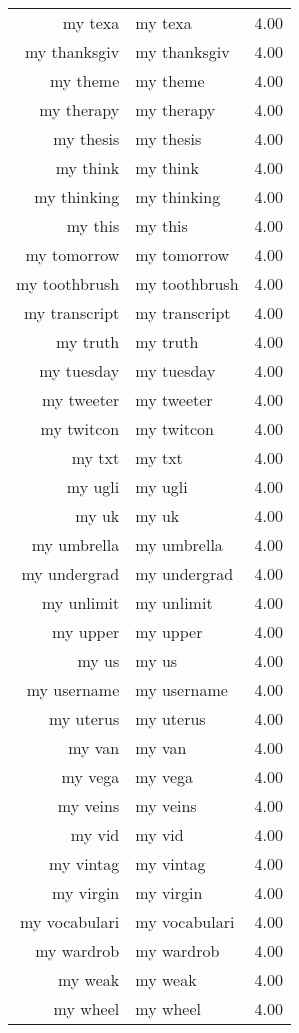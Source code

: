 \begin{table}[ht]
\begin{tabular}{rlr}
  my texa & my texa & 4.00 \\ 
  my thanksgiv & my thanksgiv & 4.00 \\ 
  my theme & my theme & 4.00 \\ 
  my therapy & my therapy & 4.00 \\ 
  my thesis & my thesis & 4.00 \\ 
  my think & my think & 4.00 \\ 
  my thinking & my thinking & 4.00 \\ 
  my this & my this & 4.00 \\ 
  my tomorrow & my tomorrow & 4.00 \\ 
  my toothbrush & my toothbrush & 4.00 \\ 
  my transcript & my transcript & 4.00 \\ 
  my truth & my truth & 4.00 \\ 
  my tuesday & my tuesday & 4.00 \\ 
  my tweeter & my tweeter & 4.00 \\ 
  my twitcon & my twitcon & 4.00 \\ 
  my txt & my txt & 4.00 \\ 
  my ugli & my ugli & 4.00 \\ 
  my uk & my uk & 4.00 \\ 
  my umbrella & my umbrella & 4.00 \\ 
  my undergrad & my undergrad & 4.00 \\ 
  my unlimit & my unlimit & 4.00 \\ 
  my upper & my upper & 4.00 \\ 
  my us & my us & 4.00 \\ 
  my username & my username & 4.00 \\ 
  my uterus & my uterus & 4.00 \\ 
  my van & my van & 4.00 \\ 
  my vega & my vega & 4.00 \\ 
  my veins & my veins & 4.00 \\ 
  my vid & my vid & 4.00 \\ 
  my vintag & my vintag & 4.00 \\ 
  my virgin & my virgin & 4.00 \\ 
  my vocabulari & my vocabulari & 4.00 \\ 
  my wardrob & my wardrob & 4.00 \\ 
  my weak & my weak & 4.00 \\ 
  my wheel & my wheel & 4.00 \\ 

\end{tabular}
\end{table}
